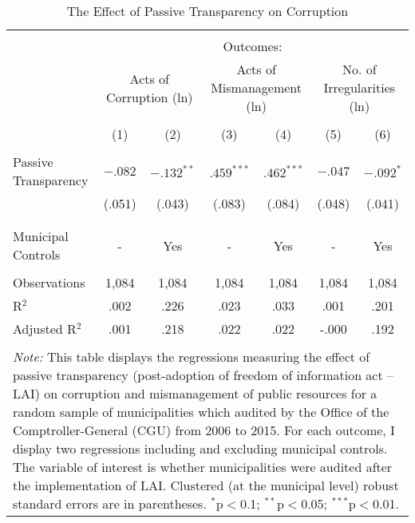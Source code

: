 
\begin{table}[!htbp] \centering
\caption{The Effect of Passive Transparency on Corruption}
\label{tab:corruption1}
\scriptsize
\begin{tabular}{@{\extracolsep{3pt}}lcccccc}
\\[-1.8ex]\hline
\hline \\[-1.8ex]
& \multicolumn{6}{c}{Outcomes:} \T \B \\
\cline{2-7}
& \multicolumn{2}{c}{Acts of Corruption (ln)} & \multicolumn{2}{c}{Acts of Mismanagement (ln)} & \multicolumn{2}{c}{No. of Irregularities (ln)} \T \B \\
\\[-1.8ex] & \multicolumn{1}{c}{(1)} & \multicolumn{1}{c}{(2)} & \multicolumn{1}{c}{(3)} & \multicolumn{1}{c}{(4)} & \multicolumn{1}{c}{(5)} & \multicolumn{1}{c}{(6)} \B\\
\hline \\[-1.8ex]
Passive Transparency & $-.082$ & $-.132^{**}$ & $.459^{***}$ & $.462^{***}$ & $-.047$ & $-.092^{*}$ \\
                     & (.051) & (.043) & (.083) & (.084) & (.048) & (.041) \\
										 & & & & & & \\
\hline \\[-1.8ex]
Municipal Controls & \multicolumn{1}{c}{-} & \multicolumn{1}{c}{Yes} & \multicolumn{1}{c}{-} & \multicolumn{1}{c}{Yes} & \multicolumn{1}{c}{-} & \multicolumn{1}{c}{Yes} \\
\hline \\[-1.8ex]
Observations & \multicolumn{1}{c}{1,084} & \multicolumn{1}{c}{1,084} & \multicolumn{1}{c}{1,084} & \multicolumn{1}{c}{1,084} & \multicolumn{1}{c}{1,084} & \multicolumn{1}{c}{1,084} \\
R$^{2}$ & \multicolumn{1}{c}{.002} & \multicolumn{1}{c}{.226} & \multicolumn{1}{c}{.023} & \multicolumn{1}{c}{.033} & \multicolumn{1}{c}{.001} & \multicolumn{1}{c}{.201} \\
Adjusted R$^{2}$ & \multicolumn{1}{c}{.001} & \multicolumn{1}{c}{.218} & \multicolumn{1}{c}{.022} & \multicolumn{1}{c}{.022} & \multicolumn{1}{c}{-.000} & \multicolumn{1}{c}{.192} \\
\hline
\hline \\[-1.8ex]
\multicolumn{7}{p{.90\textwidth}}{\emph{Note:} This table displays the regressions measuring the effect of passive transparency (post-adoption of freedom of information act -- LAI) on corruption and mismanagement of public resources for a random sample of municipalities which audited by the Office of the Comptroller-General (CGU) from 2006 to 2015. For each outcome, I display two regressions including and excluding municipal controls. The variable of interest is whether municipalities were audited after the implementation of LAI. Clustered (at the municipal level) robust standard errors are in parentheses. $^{*}$p$<$0.1; $^{**}$p$<$0.05; $^{***}$p$<$0.01.} \\
\end{tabular}
\end{table}
